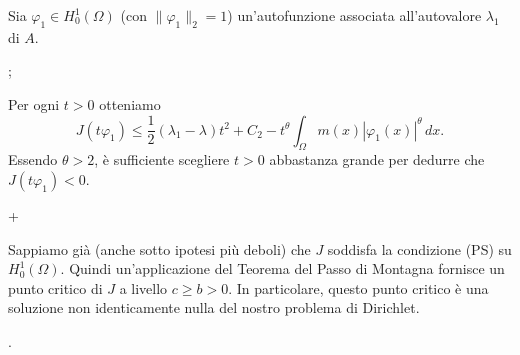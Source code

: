 Sia $\varphi_1 \in H_0^1(\Omega)$ (con $\|\varphi_1\|_2=1$)
un'autofunzione associata all'autovalore $\lambda_1$ di $A$. 

\pg;

Per ogni $t>0$ otteniamo
$$
J(t\varphi_1) \leq \frac12 (\lambda_1 - \lambda) t^2 + C_2 - t^\theta
\int_\Omega m(x) |\varphi_1(x)|^\theta \, dx.
$$
Essendo $\theta > 2$, \`e sufficiente scegliere $t>0$ abbastanza
grande per dedurre che $J(t \varphi_1)<0$.

\pg+

Sappiamo gi\`a (anche sotto ipotesi pi\`u deboli) che $J$ soddisfa la
condizione (PS) su $H_0^1(\Omega)$. Quindi un'applicazione del Teorema
del Passo di Montagna fornisce un punto critico di $J$ a livello $c
\geq b >0$. In particolare, questo punto critico \`e una soluzione non
identicamente nulla del nostro problema di Dirichlet.







\pg. %
